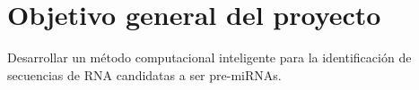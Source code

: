 \section{Objetivo general del proyecto}
Desarrollar un método computacional inteligente para la identificación
de secuencias de RNA candidatas a ser pre-miRNAs.
